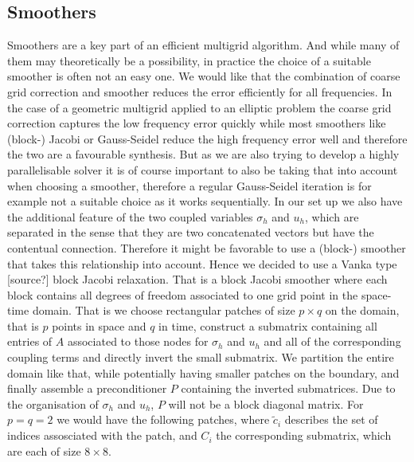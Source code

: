 \documentclass[../draft_1.tex]{subfiles}
\begin{document}
\subsection{Smoothers}
Smoothers are a key part of an efficient multigrid algorithm. And while many of them may theoretically be a possibility, in practice the choice of a suitable smoother is often not an easy one. We would like that the combination of coarse grid correction and smoother reduces the error efficiently for all frequencies. In the case of a geometric multigrid applied to an elliptic problem the coarse grid correction captures the low frequency error quickly while most smoothers like (block-) Jacobi or Gauss-Seidel reduce the high frequency error well and therefore the two are a favourable synthesis. But as we are also trying to develop a highly parallelisable solver it is of course important to also be taking that into account when choosing a smoother, therefore a regular Gauss-Seidel iteration is for example not a suitable choice as it works sequentially. In our set up we also have the additional feature of the two coupled variables $\sigma_h$ and $u_h$, which are separated in the sense that they are two concatenated vectors but have the contentual connection. Therefore it might be favorable to use a (block-) smoother that takes this relationship into account. Hence we decided to use a Vanka type [source?] block Jacobi relaxation. That is a block Jacobi smoother where each block contains all degrees of freedom associated to one grid point in the space-time domain. That is we choose rectangular patches of size $p \times q$ on the domain, that is $p$ points in space and $q$ in time, construct a submatrix containing all entries of $A$ associated to those nodes for $\sigma_h$ and $u_h$ and all of the corresponding coupling terms and directly invert the small submatrix. We partition the entire domain like that, while potentially having smaller patches on the boundary, and finally assemble a preconditioner $P$ containing the inverted submatrices. Due to the organisation of $\sigma_h$ and $u_h$, $P$ will not be a block diagonal matrix. For $p = q = 2 $ we would have the following patches, where $\tilde{c}_i$ describes the set of indices assosciated with the patch, and $C_i$ the corresponding submatrix, which are each of size $8 \times 8$. 
\end{document}
